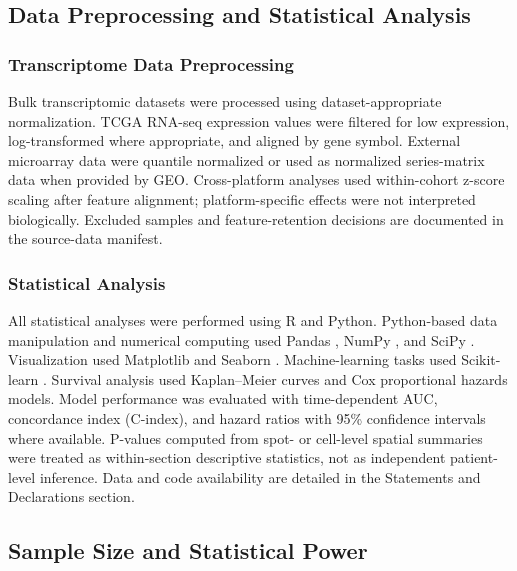 \documentclass[pdflatex,sn-mathphys-num,referee,lineno]{sn-jnl}
\theoremstyle{thmstyleone}%
\theoremstyle{thmstyletwo}%
\theoremstyle{thmstylethree}%
\begin{document}
\subsection{Data Preprocessing and Statistical Analysis}\label{subsec:preprocessing}

\subsubsection{Transcriptome Data Preprocessing}

Bulk transcriptomic datasets were processed using dataset-appropriate normalization. TCGA RNA-seq expression values were filtered for low expression, log-transformed where appropriate, and aligned by gene symbol. External microarray data were quantile normalized or used as normalized series-matrix data when provided by GEO. Cross-platform analyses used within-cohort z-score scaling after feature alignment; platform-specific effects were not interpreted biologically. Excluded samples and feature-retention decisions are documented in the source-data manifest.

\subsubsection{Statistical Analysis}

All statistical analyses were performed using R and Python. Python-based data manipulation and numerical computing used Pandas \cite{mckinneyDataStructuresStatistical2010a}, NumPy \cite{harrisArrayProgrammingNumPy2020}, and SciPy \cite{virtanenSciPy10Fundamental2020}. Visualization used Matplotlib \cite{hunterMatplotlib2DGraphics2007} and Seaborn \cite{waskomSeabornStatisticalData2021}. Machine-learning tasks used Scikit-learn \cite{pedregosaScikitlearnMachineLearning2011a}. Survival analysis used Kaplan--Meier curves and Cox proportional hazards models. Model performance was evaluated with time-dependent AUC, concordance index (C-index), and hazard ratios with 95\% confidence intervals where available. P-values computed from spot- or cell-level spatial summaries were treated as within-section descriptive statistics, not as independent patient-level inference. Data and code availability are detailed in the Statements and Declarations section.

\subsection{Sample Size and Statistical Power}\label{subsec:power}
\end{document}
